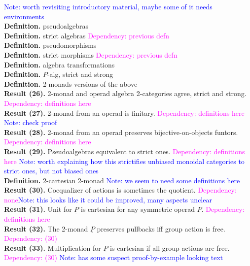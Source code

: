\documentclass{amsart}
\begin{document}
\textcolor{blue}{Note: worth revisiting introductory material, maybe some of it needs environments}
\\ \textbf{Definition.} pseudoalgebras
\\ \textbf{Definition.} strict algebras \textcolor{magenta}{Dependency: previous defn}
\\ \textbf{Definition.} pseudomorphisms
\\ \textbf{Definition.} strict morphisms \textcolor{magenta}{Dependency: previous defn}
\\ \textbf{Definition.} algebra transformations
\\ \textbf{Definition.} $P$-alg, strict and strong
\\ \textbf{Definition.} 2-monads versions of the above
\\ \textbf{Result (26).} 2-monad and operad algebra 2-categories agree, strict and strong. \textcolor{magenta}{Dependency: definitions here}
\\ \textbf{Result (27).} 2-monad from an operad is finitary. \textcolor{magenta}{Dependency: definitions here} \textcolor{blue}{Note: check proof}
\\ \textbf{Result (28).} 2-monad from an operad preserves bijective-on-objects funtors. \textcolor{magenta}{Dependency: definitions here}
\\ \textbf{Result (29).} Pseudoalgebras equivalent to strict ones. \textcolor{magenta}{Dependency: definitions here} \textcolor{blue}{Note: worth explaining how this strictifies unbiased monoidal categories to strict ones, but not biased ones}
\\ \textbf{Definition.} 2-cartesian 2-monad \textcolor{blue}{Note: we seem to need some definitions here}
\\ \textbf{Result (30).} Coequalizer of actions is sometimes the quotient. \textcolor{magenta}{Dependency: none}\textcolor{blue}{Note: this looks like it could be improved, many aspects unclear}
\\ \textbf{Result (31).} Unit for $\underline{P}$ is cartesian for any symmetric operad $P$. \textcolor{magenta}{Dependency: definitions here}
\\ \textbf{Result (32).} The 2-monad $\underline{P}$ preserves pullbacks iff group action is free. \textcolor{magenta}{Dependency: (30)}
\\ \textbf{Result (33).} Multiplication for $\underline{P}$ is cartesian if all group actions are free. \textcolor{magenta}{Dependency: (30)} \textcolor{blue}{Note: has some suspect proof-by-example looking text}
\end{document}
